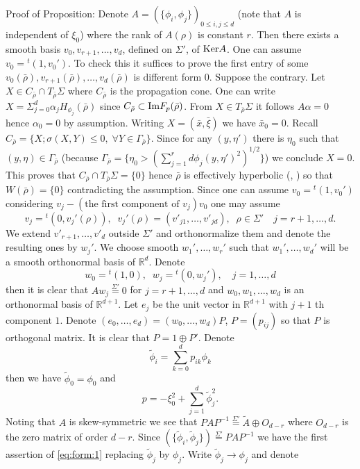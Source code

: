 \documentclass[12pt,leqno]{article} %
\def\al{\alpha}
\def\sieq{\overset{\Sigma'}{=}}
\def\R{{\mathbb R}}
\def\bro{\bar\rho}
\def\R{\mathbb{R}}
\def\bro{\bar\rho}
\numberwithin{equation}{section}
\begin{document}
\medskip

\noindent
Proof of Proposition: 
 Denote $A=(\{\phi_i,\phi_j\})_{0\leq i,j\leq d}$ (note that $A$ is
 independent of $\xi_0$) where the rank of $A(\rho)$ is constant
 $r$. Then there exists a smooth basis $v_0, v_{r+1},\ldots, v_d$,
 defined on $\Sigma'$,  of ${\rm Ker}A$. One can assume $v_0={^t}(1,
 v_0')$. To check this it suffices to prove the first entry of some
 $v_0(\bro), v_{r+1}(\bro),\ldots, v_d(\bro)$ is different form
 $0$. Suppose the contrary. Let $ X\in C_{\bro}\cap T_{\bro}\Sigma$
 where $C_{\bro}$ is the propagation cone. One can write
 $X=\Sigma_{j=0}^d\al_jH_{\phi_j}(\bro)$ since $C_{\bro}\subset {\rm
   Im}F_p(\bro)$. From $X\in T_{\bro}\Sigma$ it follows $A\al=0$ hence
 $\al_0=0$ by assumption. Writing $X=(\bar x,\bar\xi)$ we have $\bar
 x_0=0$. Recall $C_{\bro}=\{X; \sigma(X,Y)\leq 0,\;\forall Y\in
 \Gamma_{\bro}\}$. Since for any $(y,\eta')$ there is $\eta_0$ such
 that $(y, \eta)\in \Gamma_{\bro}$ (because
 $\Gamma_{\bro}=\{\eta_0>(\sum_{j=1}^rd\phi_j(y,\eta')^2)^{1/2}\}$) we
 conclude $X=0$. This proves that $C_{\bro}\cap T_{\bro}\Sigma=\{0\}$
 hence $\bro$ is effectively hyperbolic (\cite[Corollary
 1.4.7]{MR492751}, \cite[Lemma 1.1.2]{MR1166190}) so that $W(\bro)=
 \{0\}$ contradicting the assumption.
 Since one can assume $v_0={^t}(1, v_0')$ considering $v_j-(\text{the first component of $v_{j}$})v_0$ one may assume
%
\[
v_{j}={^t}(0, v_j'(\rho)),\;\;v_j'(\rho)=(v'_{j1},\ldots,v'_{jd}),\;\;\rho\in\Sigma'\quad j=r+1,\ldots,d.
\]
%
We extend $v'_{r+1},\ldots, v'_d$ outside $\Sigma'$ and orthonormalize them and denote the resulting ones by $w_j'$. 
We choose smooth $w_1',\ldots, w_r'$ such that $w_1',\ldots, w_d'$ will be a smooth orthonormal basis of $\R^d$. Denote 
%
\[
w_0={^t}(1, 0),\;\;w_j={^t}(0, w_j'),\quad j=1,\ldots,d
\]
%
then it is clear that $Aw_j\sieq 0$ for $j=r+1,\ldots,d$ and $w_0,
w_1,\ldots,w_d$ is an orthonormal  basis of $\R^{d+1}$. Let $e_j$ be
the unit vector in $\R^{d+1}$ with $j+1$ th component $1$. Denote
$(e_0,\ldots,e_d)=(w_0,\ldots,w_d)P$, $P=(p_{ij})$ so that $P$ is
orthogonal matrix. It is clear that $P=1\oplus P'$.
Denote
%
\[
{\tilde \phi_i}=\sum_{k=0}^dp_{ik}\phi_k
\]
%
then we have ${\tilde \phi_0}=\phi_0$ and 
%
\[
p=-\xi_0^2+\sum_{j=1}^d{\tilde\phi_j^2}.
\]
%
Noting that $A$ is skew-symmetric we see that $PAP^{-1}\sieq \tilde A\oplus O_{d-r}$ where $O_{d-r}$ is the zero matrix of order $d-r$. Since $(\{{\tilde\phi_i},{\tilde\phi_j}\})\sieq PAP^{-1}$ we have the first assertion of \eqref{eq:form:1} replacing $\tilde\phi_j$ by $\phi_j$. Write $\tilde\phi_j\to \phi_j$ and denote
\end{document}
